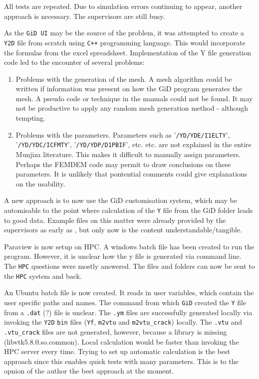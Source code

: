 \bigbreak
{} All tests are repeated. Due to simulation errors continuing to appear, another approach is necessary. The supervisors are still busy. 

\bigbreak
As the \texttt{GiD UI} may be the source of the problem, it was attempted to create a \texttt{Y2D} file from scratch using \texttt{C++} programming language. This would incorporate the formulas from the excel spreadsheet. Implementation of the Y file generation code led to the encounter of several problems:

\begin{enumerate}
    \item Problems with the generation of the mesh. A mesh algorithm could be written if information was present on how the GiD program generates the mesh. A pseudo code or technique in the manuals could not be found. It may not be productive to apply any random mesh generation method - although tempting.
    \item Problems with the parameters. Parameters such as '\texttt{/YD/YDE/I1ELTY}', '\texttt{/YD/YDC/ICFMTY}', '\texttt{/YD/YDP/D1PBIF}', etc. etc. are not explained in the entire Munjiza literature. This makes it difficult to manually assign parameters. Perhaps the FEMDEM code may permit to draw conclusions on these parameters. It is unlikely that pontential comments could give explanations on the usability.
\end{enumerate}

\bigbreak
A new approach is to now use the GiD customisation system, which may be automisable to the point where calculation of the \texttt{Y} file from the GiD folder leads to good data. Example files on this matter were already provided by the supervisors as early as {\textbf{}}, but only now is the content understandable/tangible.

\bigbreak
{}
Paraview is now setup on HPC. A windows batch file has been created to run the program. However, it is unclear how the y file is generated via command line. The \texttt{HPC} questions were mostly answered. The files and folders can now be sent to the \texttt{HPC} system and back.

\bigbreak
{}
An Ubuntu batch file is now created. It reads in user variables, which contain the user specific paths and names. The command from which \texttt{GiD} created the \texttt{Y} file from a \texttt{.dat} (?) file is unclear. The \texttt{.ym} files are successfully generated locally via invoking the \texttt{Y2D} \texttt{bin} files (\texttt{Yf}, \texttt{m2vtu} and \texttt{m2vtu\_crack}) locally. The \texttt{.vtu} and \texttt{.vtu\_crack} files are not generated, however, because a library is missing (libvtk5.8.0.so.common). Local calculation would be faster than invoking the HPC server every time. Trying to set up automatic calculation is the best approach since this enables quick tests with many parameters. This is to the opnion of the author the best approach at the moment.

